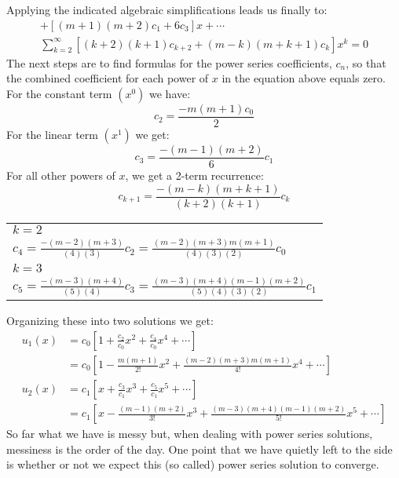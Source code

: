 Applying the indicated algebraic simplifications leads us finally to:
\begin{multline*}
[m(m+1)c_0+2c_2] + [(m+1)(m+2)c_1 + 6c_3]x + \cdots \\
\sum\limits_{k=2}^{\infty}[(k+2)(k+1)c_{k+2} + (m-k)(m+k+1)c_k]x^k=0
\end{multline*}
The next steps are to find formulas for the power series coefficients, $c_n$, so that the combined coefficient for each power of $x$ in the equation above equals zero. For the constant term $(x^0)$ we have:
\begin{equation*}
c_2 = \frac{-m(m+1)c_0}{2}
\end{equation*}
For the linear term $(x^1)$ we get:
\begin{equation*}
c_3 = \frac{-(m-1)(m+2)}{6}c_1
\end{equation*}
For all other powers of $x$, we get a 2-term recurrence:
\begin{equation*}
c_{k+1} = \frac{-(m-k)(m+k+1)}{(k+2)(k+1)}c_k
\end{equation*}
\begin{margintable}
\begin{tabular}{l}
$k=2$ \\
$c_4 = \frac{-(m-2)(m+3)}{(4)(3)}c_2 = \frac{(m-2)(m+3)m(m+1)}{(4)(3)(2)}c_0$ \\
$k=3$ \\
$c_5 = \frac{-(m-3)(m+4)}{(5)(4)}c_3 = \frac{(m-3)(m+4)(m-1)(m+2)}{(5)(4)(3)(2)}c_1$ \\
\end{tabular}
\end{margintable}
\noindent Organizing these into two solutions we get:
\begin{align*}
u_1(x) &= c_0\left[1 + \frac{c_2}{c_0}x^2 + \frac{c_4}{c_0}x^4 + \cdots \right] \\
&= c_0 \left[1-\frac{m(m+1)}{2!}x^2 + \frac{(m-2)(m+3)m(m+1)}{4!}x^4 + \cdots  \right] \\
u_2(x) &= c_1\left[x + \frac{c_3}{c_1}x^3 + \frac{c_5}{c_1}x^5 + \cdots \right] \\
&= c_1\left[x - \frac{(m-1)(m+2)}{3!}x^3+\frac{(m-3)(m+4)(m-1)(m+2)}{5!}x^5 + \cdots \right]
\end{align*}
So far what we have is messy but, when dealing with power series solutions, messiness is the order of the day.  One point that we have quietly left to the side is whether or not we expect this (so called) power series solution  to converge.

